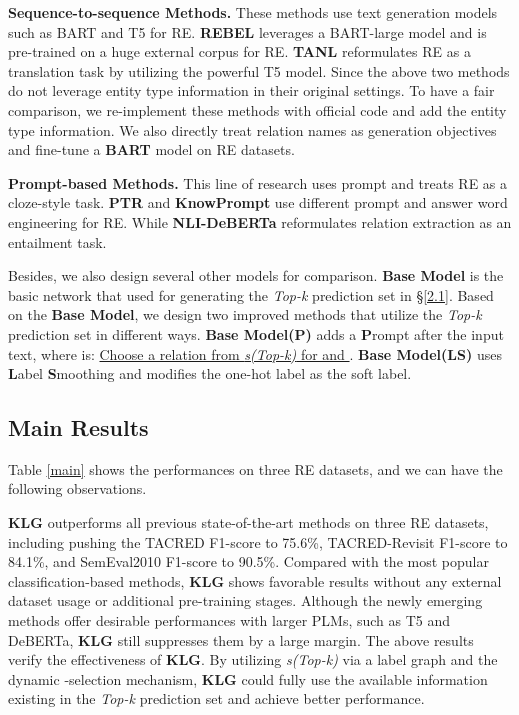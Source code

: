 \textbf{Sequence-to-sequence Methods.} These methods use text generation models such as BART \cite{lewis-etal-2020-bart} and T5 \cite{DBLP:journals/jmlr/RaffelSRLNMZLL20} for RE. 
\textbf{REBEL} \cite{DBLP:conf/emnlp/CabotN21} leverages a BART-large model and is pre-trained on a huge external corpus for RE. \textbf{TANL}\cite{DBLP:conf/iclr/PaoliniAKMAASXS21} reformulates RE as a translation task by utilizing the powerful T5 model. Since the above two methods do not leverage entity type information in their original settings. To have a fair comparison, we re-implement these methods with official code and add the entity type information. We also directly treat relation names as generation objectives and fine-tune a \textbf{BART} model on RE datasets.

\textbf{Prompt-based Methods.} This line of research uses prompt and treats RE as a cloze-style task. \textbf{PTR} \cite{DBLP:journals/corr/abs-2105-11259} and \textbf{KnowPrompt} \cite{DBLP:conf/www/ChenZXDYTHSC22} use different prompt and answer word engineering for RE. While \textbf{NLI-DeBERTa} \cite{DBLP:conf/emnlp/SainzLLBA21} reformulates relation extraction as an entailment task.

Besides, we also design several other models for comparison. \textbf{Base Model} is the basic network that used for generating the \textit{Top-k} prediction set in \S \ref{2.1}. Based on the \textbf{Base Model}, we design two improved methods that utilize the \textit{Top-k} prediction set in different ways. \textbf{Base Model(P)} adds a \textbf{P}rompt  after the input text, where  is: \uline{Choose a relation from \textit{s(Top-k)} for  and }. \textbf{Base Model(LS)} uses \textbf{L}abel \textbf{S}moothing \cite{DBLP:conf/icml/IoffeS15} and modifies the one-hot label as the soft label. 


\subsection{Main Results}\label{main_result}
Table \ref{main} shows the performances on three RE datasets, and we can have the following observations.

\textbf{KLG} outperforms all previous state-of-the-art methods on three RE datasets, including pushing the TACRED F1-score to 75.6\%, TACRED-Revisit F1-score to 84.1\%, and SemEval2010 F1-score to 90.5\%. Compared with the most popular classification-based methods, \textbf{KLG} shows favorable results without any external dataset usage or additional pre-training stages. Although the newly emerging methods offer desirable performances with larger PLMs, such as T5 and DeBERTa, \textbf{KLG} still suppresses them by a large margin. The above results verify the effectiveness of \textbf{KLG}. By utilizing \textit{s(Top-k)} via a label graph and the dynamic -selection mechanism, \textbf{KLG} could fully use the available information existing in the \textit{Top-k} prediction set and achieve better performance.
    
